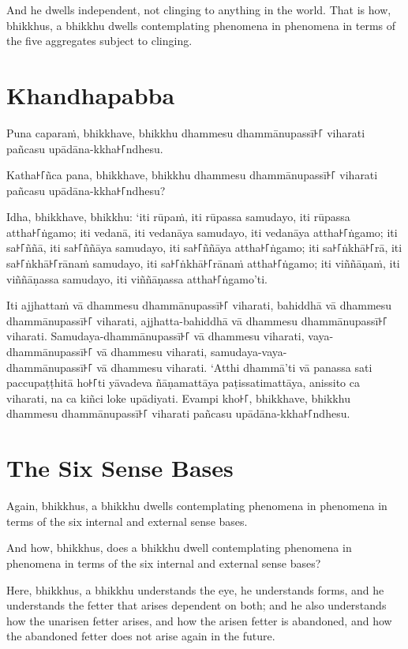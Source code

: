 And he dwells independent, not clinging to anything in the world. That is how,
bhikkhus, a bhikkhu dwells contemplating phenomena in phenomena in terms of the
five aggregates subject to clinging.


\paliPage
\section*{Khandhapabba}

Puna caparaṁ, bhikkhave, bhikkhu dhammesu dhammānupassī꜔꜒ viharati pañcasu
upādāna-kkha꜔꜒ndhesu.

Katha꜔꜒ñca pana, bhikkhave, bhikkhu dhammesu dhammānupassī꜔꜒ viharati pañcasu
upādāna-kkha꜔꜒ndhesu?

Idha, bhikkhave, bhikkhu:
‘iti rūpaṁ, iti rūpassa samudayo, iti rūpassa attha꜔꜒ṅgamo;
iti vedanā, iti vedanāya samudayo, iti vedanāya attha꜔꜒ṅgamo;
iti sa꜔꜒ññā, iti sa꜔꜒ññāya samudayo, iti sa꜔꜒ññāya attha꜔꜒ṅgamo;
iti sa꜔꜒ṅkhā꜔꜒rā, iti sa꜔꜒ṅkhā꜔꜒rānaṁ samudayo, iti sa꜔꜒ṅkhā꜔꜒rānaṁ attha꜔꜒ṅgamo;
iti viññāṇaṁ, iti viññāṇassa samudayo, iti viññāṇassa attha꜔꜒ṅgamo’ti.

Iti ajjhattaṁ vā dhammesu dhammānupassī꜔꜒ viharati,
bahiddhā vā dhammesu dhammānupassī꜔꜒ viharati,
ajjhatta-bahiddhā vā dhammesu dhammānupassī꜔꜒ viharati.
Samudaya-dhammānupassī꜔꜒ vā dhammesu viharati,
vaya-dhammānupassī꜔꜒ vā dhammesu viharati,
samudaya-vaya-\\ dhammānupassī꜔꜒ vā dhammesu viharati.
‘Atthi dhammā’ti vā panassa sati paccupaṭṭhitā ho꜔꜒ti
yāvadeva ñāṇamattāya paṭissatimattāya, anissito ca viharati,
na ca kiñci loke upādiyati. Evampi kho꜔꜒, bhikkhave, bhikkhu
dhammesu dhammānupassī꜔꜒ viharati pañcasu upādāna-kkha꜔꜒ndhesu.


\englishPage
\section{The Six Sense Bases}

Again, bhikkhus, a bhikkhu dwells contemplating phenomena in phenomena in terms
of the six internal and external sense bases.

And how, bhikkhus, does a bhikkhu dwell contemplating phenomena in phenomena in
terms of the six internal and external sense bases?

Here, bhikkhus, a bhikkhu understands the eye, he understands forms, and he
understands the fetter that arises dependent on both; and he also understands
how the unarisen fetter arises, and how the arisen fetter is abandoned, and how
the abandoned fetter does not arise again in the future.

